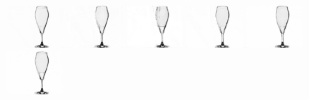     \\
    \includegraphics[width=0.160\textwidth]{ch-tomnet/images/Ablation/FlowSup_290_shape0000000040937_rho_crop.png}
    \includegraphics[width=0.160\textwidth]{ch-tomnet/images/Ablation/crosslink_290_shap4_000000040937_rho_crop.png}
    \includegraphics[width=0.160\textwidth]{ch-tomnet/images/Ablation/multiscale_290_sha14_000000040937_rho_crop.png}
    \includegraphics[width=0.160\textwidth]{ch-tomnet/images/Ablation/recons_290_shape0000000040937_rho_crop.png}
    \includegraphics[width=0.160\textwidth]{ch-tomnet/images/Ablation/coarse_290_shape0000000040937_rho_crop.png}
    \includegraphics[width=0.160\textwidth]{ch-tomnet/images/Ablation/ablation_290_shape_000000040937_rho_crop.png}
    \\
    \vspace{-0.3em}
    \\

